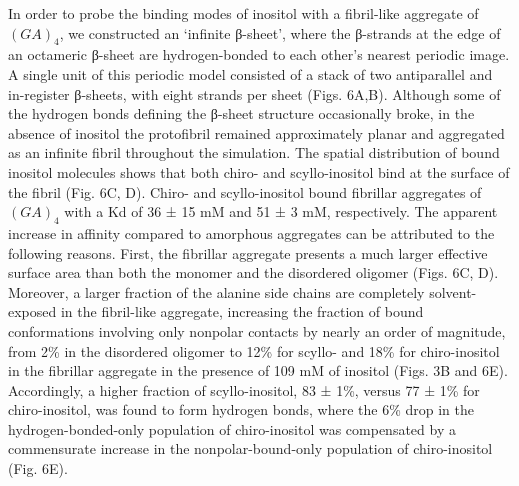 In order to probe the binding modes of inositol with a fibril-like aggregate of $(GA)_4$, we constructed an ‘infinite β-sheet’, where the β-strands at the edge of an octameric β-sheet are hydrogen-bonded to each other’s nearest periodic image. A single unit of this periodic model consisted of a stack of two antiparallel and in-register β-sheets, with eight strands per sheet (Figs. 6A,B). Although some of the hydrogen bonds defining the β-sheet structure occasionally broke, in the absence of inositol the protofibril remained approximately planar and aggregated as an infinite fibril throughout the simulation.
	The spatial distribution of bound inositol molecules shows that both chiro- and scyllo-inositol bind at the surface of the fibril (Fig. 6C, D). Chiro- and scyllo-inositol bound fibrillar aggregates of $(GA)_4$ with a Kd of 36 ± 15 mM and 51 ± 3 mM, respectively. The apparent increase in affinity compared to amorphous aggregates can be attributed to the following reasons. First, the fibrillar aggregate presents a much larger effective surface area than both the monomer and the disordered oligomer (Figs. 6C, D). Moreover, a larger fraction of the alanine side chains are completely solvent-exposed in the fibril-like aggregate, increasing the fraction of bound conformations involving only nonpolar contacts by nearly an order of magnitude, from 2\% in the disordered oligomer to 12\% for scyllo- and 18\% for chiro-inositol in the fibrillar aggregate in the presence of 109 mM of inositol (Figs. 3B and 6E). Accordingly, a higher fraction of scyllo-inositol, 83 ± 1\%, versus 77 ± 1\% for chiro-inositol, was found to form hydrogen bonds, where the 6\% drop in the hydrogen-bonded-only population of chiro-inositol was compensated by a commensurate increase in the nonpolar-bound-only population of chiro-inositol (Fig. 6E).
	
